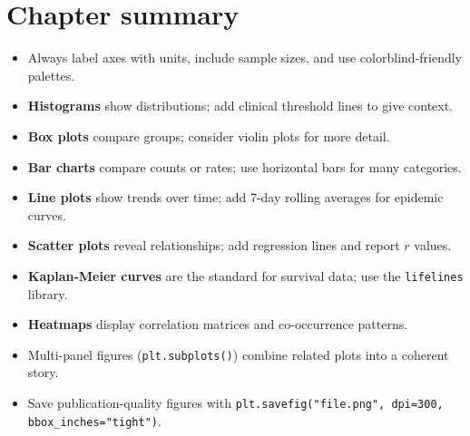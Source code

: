 \section{Chapter summary}

\begin{itemize}
  \item Always label axes with units, include sample sizes, and use colorblind-friendly palettes.
  \item \textbf{Histograms} show distributions; add clinical threshold lines to give context.
  \item \textbf{Box plots} compare groups; consider violin plots for more detail.
  \item \textbf{Bar charts} compare counts or rates; use horizontal bars for many categories.
  \item \textbf{Line plots} show trends over time; add 7-day rolling averages for epidemic curves.
  \item \textbf{Scatter plots} reveal relationships; add regression lines and report $r$ values.
  \item \textbf{Kaplan-Meier curves} are the standard for survival data; use the \texttt{lifelines} library.
  \item \textbf{Heatmaps} display correlation matrices and co-occurrence patterns.
  \item Multi-panel figures (\texttt{plt.subplots()}) combine related plots into a coherent story.
  \item Save publication-quality figures with \texttt{plt.savefig("file.png", dpi=300, bbox\_inches="tight")}.
\end{itemize}
